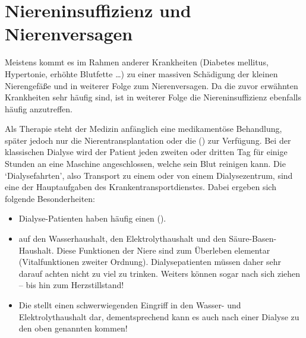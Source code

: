 {
}{}




\section{Niereninsuffizienz und Nierenversagen}
\label{topic:niereninsuffizienz}
\label{topic:cni-therapie-dialyse}
\label{topic:dialysepatienten-gefahren}


Meistens kommt es im Rahmen anderer Krankheiten (Diabetes
mellitus, Hypertonie, erhöhte Blutfette \ldots) zu einer
massiven Schädigung der kleinen Nierengefäße und in weiterer
Folge zum Nierenversagen. Da die zuvor erwähnten Krankheiten
sehr häufig sind, ist in weiterer Folge die
Niereninsuffizienz ebenfalls häufig anzutreffen.

Als Therapie steht der Medizin anfänglich eine medikamentöse
Behandlung, später jedoch nur die Nierentransplantation oder
die  () zur
Verfügung. Bei der klassischen Dialyse wird der Patient jeden
zweiten oder dritten Tag für einige Stunden an eine Maschine
angeschlossen, welche sein Blut reinigen kann. Die
\enquote*{Dialysefahrten}, also Transport zu einem oder von
einem Dialysezentrum, sind eine der Hauptaufgaben des
Krankentransportdienstes. Dabei ergeben sich folgende
Besonderheiten: 

\begin{itemize}
  \item Dialyse-Patienten haben häufig einen
   ().
  \item {}
  auf den Wasserhaushalt, den Elektrolythaushalt und den
  Säure-Basen-Haushalt. Diese Funktionen der Niere sind zum
  Überleben elementar (Vitalfunktionen zweiter Ordnung).
  Dialysepatienten müssen daher sehr darauf achten nicht zu
  viel zu trinken. Weiters können 
  sogar  nach sich ziehen --
  bis hin zum Herzstillstand!
  \item Die  stellt einen schwerwiegenden
  Eingriff in den Wasser- und Elektrolythaushalt dar, dementsprechend
  kann es auch nach einer Dialyse zu den oben genannten
   kommen!
\end{itemize}


